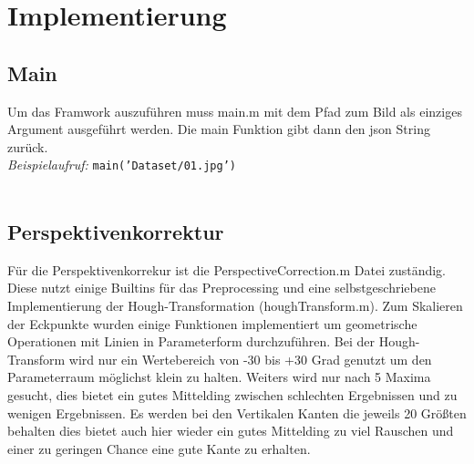 \documentclass[paper=A4, deutsch]{scrartcl}
\begin{document}

\section{Implementierung}
\subsection{Main}
Um das Framwork auszuführen muss main.m mit dem Pfad zum Bild als einziges Argument ausgeführt werden. Die main Funktion gibt dann den json String zurück.\\
\textit{Beispielaufruf:} \texttt{main('Dataset/01.jpg')}\\
\\
\subsection{Perspektivenkorrektur}
Für die Perspektivenkorrekur ist die PerspectiveCorrection.m Datei zuständig. Diese nutzt einige Builtins für das Preprocessing und eine selbstgeschriebene Implementierung der Hough-Transformation (houghTransform.m). Zum Skalieren der Eckpunkte wurden einige Funktionen implementiert um geometrische Operationen mit Linien in Parameterform durchzuführen. Bei der Hough-Transform wird nur ein Wertebereich von -30 bis +30 Grad genutzt um den Parameterraum möglichst klein zu halten. Weiters wird nur nach 5 Maxima gesucht, dies bietet ein gutes Mittelding zwischen schlechten Ergebnissen und zu wenigen Ergebnissen. Es werden bei den Vertikalen Kanten die jeweils 20 Größten behalten dies bietet auch hier wieder ein gutes Mittelding zu viel Rauschen und einer zu geringen Chance eine gute Kante zu erhalten.\\
\\
\end{document}
